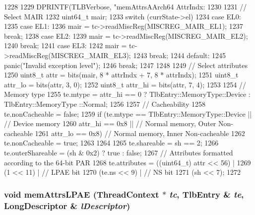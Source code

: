 \begin{DoxyCode}
1228 {
1229     DPRINTF(TLBVerbose, "memAttrsAArch64 AttrIndx:%
1230 
1231     // Select MAIR
1232     uint64_t mair;
1233     switch (currState->el) {
1234       case EL0:
1235       case EL1:
1236         mair = tc->readMiscReg(MISCREG_MAIR_EL1);
1237         break;
1238       case EL2:
1239         mair = tc->readMiscReg(MISCREG_MAIR_EL2);
1240         break;
1241       case EL3:
1242         mair = tc->readMiscReg(MISCREG_MAIR_EL3);
1243         break;
1244       default:
1245         panic("Invalid exception level");
1246         break;
1247     }
1248 
1249     // Select attributes
1250     uint8_t attr = bits(mair, 8 * attrIndx + 7, 8 * attrIndx);
1251     uint8_t attr_lo = bits(attr, 3, 0);
1252     uint8_t attr_hi = bits(attr, 7, 4);
1253 
1254     // Memory type
1255     te.mtype = attr_hi == 0 ? TlbEntry::MemoryType::Device : TlbEntry::MemoryType
      ::Normal;
1256 
1257     // Cacheability
1258     te.nonCacheable = false;
1259     if (te.mtype == TlbEntry::MemoryType::Device ||  // Device memory
1260         attr_hi == 0x8 ||  // Normal memory, Outer Non-cacheable
1261         attr_lo == 0x8) {  // Normal memory, Inner Non-cacheable
1262         te.nonCacheable = true;
1263     }
1264 
1265     te.shareable       = sh == 2;
1266     te.outerShareable = (sh & 0x2) ? true : false;
1267     // Attributes formatted according to the 64-bit PAR
1268     te.attributes = ((uint64_t) attr << 56) |
1269         (1 << 11) |     // LPAE bit
1270         (te.ns << 9) |  // NS bit
1271         (sh << 7);
1272 }
\end{DoxyCode}
\hypertarget{classArmISA_1_1TableWalker_ae00bd2d40b63721817ec582dbf4022a5}{
\subsubsection[{memAttrsLPAE}]{\setlength{\rightskip}{0pt plus 5cm}void memAttrsLPAE ({\bf ThreadContext} $\ast$ {\em tc}, \/  {\bf TlbEntry} \& {\em te}, \/  {\bf LongDescriptor} \& {\em lDescriptor})}}
\label{classArmISA_1_1TableWalker_ae00bd2d40b63721817ec582dbf4022a5}



